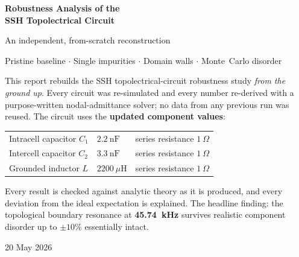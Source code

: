 \documentclass[11pt]{article}
\begin{document}
\begin{titlepage}
\centering
\vspace*{2.0cm}
{\Huge\bfseries\color{accent} Robustness Analysis of the\\[6pt]
SSH Topolectrical Circuit\par}
\vspace{10pt}
{\Large An independent, from-scratch reconstruction\par}
\vspace{1.2cm}
{\large Pristine baseline \;$\cdot$\; Single impurities \;$\cdot$\;
Domain walls \;$\cdot$\; Monte~Carlo disorder\par}
\vspace{1.8cm}

\begin{minipage}{0.86\linewidth}
\color{ink}\large
This report rebuilds the SSH topolectrical-circuit robustness study
\emph{from the ground up}. Every circuit was re-simulated and every number
re-derived with a purpose-written nodal-admittance solver; no data from any
previous run was reused. The circuit uses the \textbf{updated component
values}:
\vspace{6pt}
\begin{center}
\begin{tabular}{lll}
\toprule
Intracell capacitor $C_1$ & $2.2\ \mathrm{nF}$ & series resistance $1\ \Omega$\\
Intercell capacitor $C_2$ & $3.3\ \mathrm{nF}$ & series resistance $1\ \Omega$\\
Grounded inductor $L$     & $2200\ \mu\mathrm{H}$ & series resistance $1\ \Omega$\\
\bottomrule
\end{tabular}
\end{center}
\vspace{6pt}
Every result is checked against analytic theory as it is produced, and every
deviation from the ideal expectation is explained. The headline finding: the
topological boundary resonance at \textbf{45.74~kHz} survives realistic
component disorder up to $\pm10\%$ essentially intact.
\end{minipage}

\vfill
{\large 20 May 2026\par}
\end{titlepage}

\end{document}
